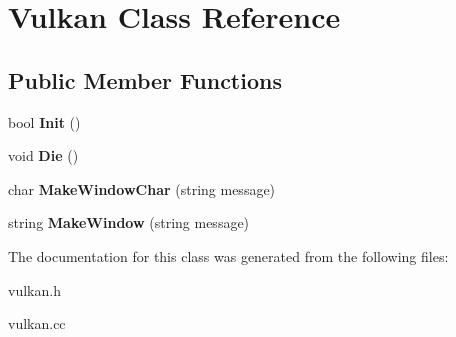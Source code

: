 \hypertarget{classVulkan}{}\section{Vulkan Class Reference}
\label{classVulkan}
\subsection*{Public Member Functions}
\begin{DoxyCompactItemize}
\item 
\mbox{\label{classVulkan_a308c68e03405bc740435a2af62cc7434}} 
bool {\bfseries Init} ()
\item 
\mbox{\label{classVulkan_a728e47da1e42d65c6d9efa5106f6d13b}} 
void {\bfseries Die} ()
\item 
\mbox{\label{classVulkan_a70565678cd6771ac57706ff8586e256f}} 
char {\bfseries Make\+Window\+Char} (string message)
\item 
\mbox{\label{classVulkan_a46c4ec53f8960a1fa3f3eb63d7755654}} 
string {\bfseries Make\+Window} (string message)
\end{DoxyCompactItemize}


The documentation for this class was generated from the following files\+:\begin{DoxyCompactItemize}
\item 
vulkan.\+h\item 
vulkan.\+cc\end{DoxyCompactItemize}
